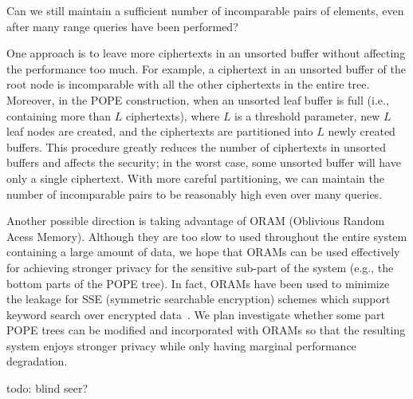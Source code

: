 \begin{question}
Can we still maintain a sufficient number of incomparable pairs of elements, even after
  many range queries have been performed?  
\end{question}

One approach is to leave more ciphertexts in an unsorted buffer without
affecting the performance too much. For example, a ciphertext in an unsorted
buffer of the root node is incomparable with all the other ciphertexts in the
entire tree.  Moreover, in the POPE construction, when an unsorted leaf buffer
is full (i.e.,  containing more than $L$ ciphertexts), where $L$ is a threshold
parameter, new $L$ leaf nodes are created, and the ciphertexts are partitioned
into $L$ newly created buffers. This procedure greatly reduces the number of
ciphertexts in unsorted buffers and affects the security; in the worst case,
some unsorted buffer will have only a single ciphertext. With more careful
partitioning, we can maintain the number of incomparable pairs to be reasonably
high even over many queries. 


Another possible direction is taking advantage of ORAM (Oblivious Random Acess
Memory). Although they are too slow to used throughout the entire system
containing a large amount of data, we hope that ORAMs can be used effectively
for achieving stronger privacy for the sensitive sub-part of the system (e.g.,
the bottom parts of the POPE tree).  In fact, ORAMs have been used to minimize
the leakage for SSE (symmetric searchable encryption) schemes which support
keyword search over encrypted data~\cite{NDSS:StePapShi14,C:GarMohPap16}. We
plan investigate whether some part POPE trees can be modified and incorporated
with ORAMs so that the resulting system enjoys stronger privacy while only
having marginal performance degradation.  


todo: blind seer?
